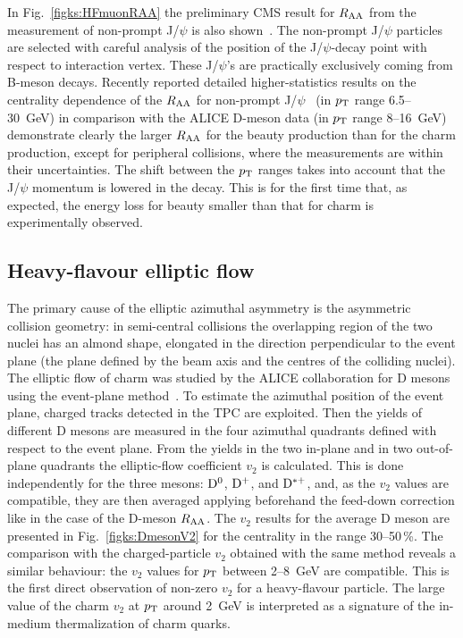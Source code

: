 In Fig.~\ref{figks:HFmuonRAA} the preliminary CMS result for $R_{\rm AA}$ from the measurement of non-prompt J/$\psi$ is also shown~\cite{Chatrchyan:2012np}. The non-prompt J/$\psi$ particles are selected with careful analysis of the position of the J/$\psi$-decay point with respect to interaction vertex. These J/$\psi$'s are practically exclusively coming from B-meson decays. Recently reported detailed higher-statistics results on the centrality dependence of the $R_{\rm AA}$ for non-prompt J/$\psi$~\cite{CMS:2012wba} (in $p_{\rm T}$ range 6.5--30~GeV)  in comparison with the ALICE D-meson data (in $p_{\rm T}$ range 8--16~GeV) demonstrate clearly the larger $R_{\rm AA}$ for the beauty production than for the charm production, except for peripheral collisions, where the measurements are within their uncertainties. The shift between the $p_{\rm T}$ ranges takes into account that the J/$\psi$ momentum is lowered in the decay. This is for the first time that, as expected, the energy loss for beauty smaller than that for charm is experimentally observed.
\subsection{Heavy-flavour elliptic flow}
\label{subsecks:heavyflow}
The primary cause of the elliptic azimuthal asymmetry is the asymmetric collision geometry: in semi-central collisions the overlapping region of the two nuclei has an almond shape, elongated in the direction perpendicular to the event plane (the plane defined by the beam axis and the centres of the colliding nuclei). The elliptic flow of charm was studied by the ALICE collaboration for D mesons using the event-plane method~\cite{Abelev:2013lca}. To estimate the azimuthal position of the event plane, charged tracks detected in the TPC are exploited. Then the yields of different D mesons are measured in the four azimuthal quadrants defined with respect to the event plane. From the yields in the two in-plane and in two out-of-plane quadrants the elliptic-flow coefficient $v_2$ is calculated. This is done independently for the three mesons: ${\rm D}^0$, ${\rm D}^+$, and ${\rm D}^{*+}$, and, as the $v_2$ values are compatible, they are then averaged applying beforehand the feed-down correction like in the case of the D-meson $R_{\rm AA}$. The $v_2$ results for the average D meson are presented in Fig.~\ref{figks:DmesonV2} for the centrality in the range 30--50\,\%. The comparison with the charged-particle $v_2$ obtained with the same method reveals a similar behaviour: the $v_2$ values for $p_{\rm T}$ between 2--8~GeV are compatible. This is the first direct observation of non-zero $v_2$ for a heavy-flavour particle. The large value of the charm $v_2$ at $p_{\rm T}$ around 2~GeV is interpreted as a signature of the in-medium thermalization of charm quarks.

